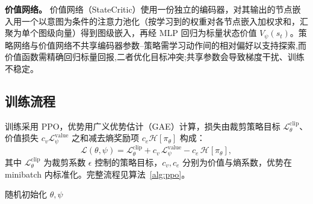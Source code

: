 \textbf{价值网络。} 价值网络（StateCritic）使用一份独立的编码器，对其输出的节点嵌入用一个以意图为条件的注意力池化（按学习到的权重对各节点嵌入加权求和，汇聚为单个图级向量）得到图级嵌入，再经 MLP 回归为标量状态价值 $V_\psi(s_t)$。策略网络与价值网络不共享编码器参数--策略需学习动作间的相对偏好以支持探索,而价值函数需精确回归标量回报,二者优化目标冲突;共享参数会导致梯度干扰、训练不稳定。

\subsection{训练流程}
\label{sec:method:train}

训练采用 PPO，优势用广义优势估计（GAE）计算，损失由裁剪策略目标 $\mathcal{L}^{\text{clip}}_\theta$、价值损失 $c_v\mathcal{L}^{\text{value}}_\psi$ 之和减去熵奖励项 $c_e\mathcal{H}[\pi_\theta]$ 构成：
\begin{equation}
\mathcal{L}(\theta,\psi) = \mathcal{L}^{\text{clip}}_\theta + c_v\,\mathcal{L}^{\text{value}}_\psi - c_e\,\mathcal{H}[\pi_\theta],
\label{eq:loss}
\end{equation}
其中 $\mathcal{L}^{\text{clip}}_\theta$ 为裁剪系数 $\epsilon$ 控制的策略目标，$c_v,c_e$ 分别为价值与熵系数，优势在 minibatch 内标准化。完整流程见算法~\ref{alg:ppo}。

\begin{algorithm}[t]
\caption{流感知 QoS-FiLM 的 PPO 训练}
\label{alg:ppo}
随机初始化 $\theta,\psi$\;
\end{algorithm}
